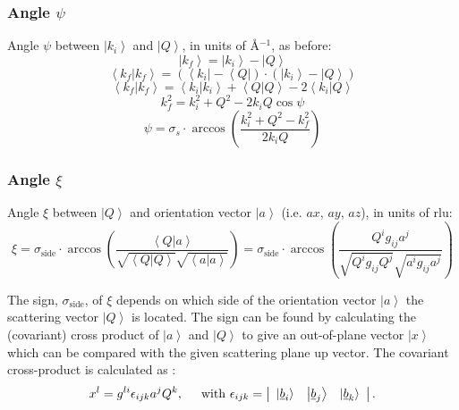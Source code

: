 \subsubsection*{Angle $\psi$}
Angle $\psi$ between $\left| k_i \right>$ and $\left| Q \right>$, in units of \AA{}$^{-1}$, as before:
\begin{equation}
	\left| k_f \right> = \left| k_i \right> - \left| Q \right> 
\end{equation}
\begin{equation} 
	\left< k_f | k_f \right> = \left( \left< k_i \right| - \left< Q \right| \right) \cdot \left( \left| k_i \right> - \left| Q \right> \right)
\end{equation}
\begin{equation}
	\left< k_f | k_f \right> = \left< k_i | k_i \right> + \left< Q | Q \right> - 2 \left< k_i | Q \right>
\end{equation}
\begin{equation}
	k_f^2 = k_i^2 + Q^2 - 2 k_i Q \cos \psi 
\end{equation}
\begin{equation}
	\boxed{ \psi = \sigma_s \cdot \arccos \left( \frac{k_i^2 + Q^2 - k_f^2}{2 k_i Q} \right) }
\end{equation}


\subsubsection*{Angle $\xi$}
Angle $\xi$ between $\left| Q \right>$ and orientation vector $\left| a \right>$ (i.e. $ax$, $ay$, $az$), in units of rlu:
\begin{equation} 
	\boxed{ \xi = 
\sigma_{\mathrm{side}} \cdot \arccos \left( \frac{ \left< Q | a \right> }{ \sqrt{\left< Q | Q \right>} \sqrt{\left< a | a \right>} } \right) = 
\sigma_{\mathrm{side}} \cdot \arccos \left( \frac{ Q^i g_{ij} a^j }{ \sqrt{Q^i g_{ij} Q^j} \sqrt{a^i g_{ij} a^j} } \right) } 
\end{equation}

The sign, $\sigma_{\mathrm{side}}$, of $\xi$ depends on which side of the orientation vector $\left| a \right>$ 
the scattering vector $\left| Q \right>$ is located. 
The sign can be found by calculating the (covariant) cross product of $\left| a \right>$ and $\left| Q \right>$ 
to give an out-of-plane vector $\left| x \right>$ which can be compared with the given scattering plane up vector. 
The covariant cross-product is calculated as \cite[p. 815]{Arens2015}:
\begin{equation}
	x^l = g^{li} \epsilon_{ijk} a^j Q^k, \hspace{0.5cm} \mathrm{with} \ 
	\epsilon_{ijk} = \left|
		\begin{array}{ccc} \left| 
			\underline{b}_i \right> & \left| \underline{b}_j \right> & \left| \underline{b}_k \right>
		\end{array} \right|.
\end{equation}


